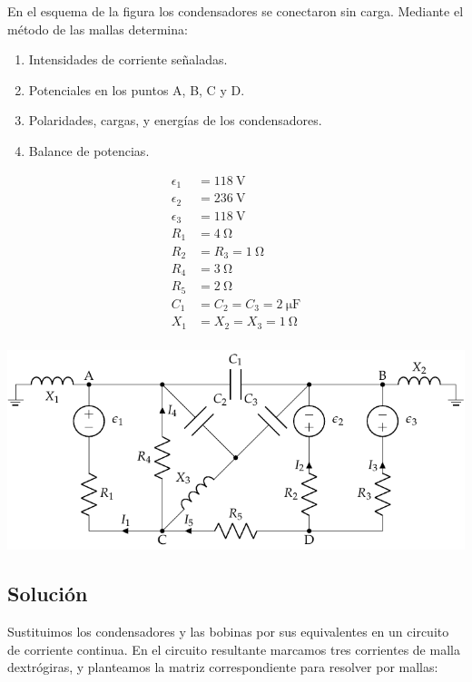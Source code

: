 \documentclass[10pt]{article}
\begin{document}
En el esquema de la figura los condensadores se conectaron sin
carga. Mediante el método de las mallas determina:
\begin{enumerate}
\item Intensidades de corriente señaladas.
\item Potenciales en los puntos A, B, C y D.
\item Polaridades, cargas, y energías de los condensadores.
\item Balance de potencias.
\end{enumerate}

\begin{minipage}[c]{0.3\linewidth}
  \begin{align*}
    \epsilon_{1}&=\SI{118}{\volt}\\
    \epsilon_{2}&=\SI{236}{\volt}\\
    \epsilon_{3}&=\SI{118}{\volt}\\
    R_{1}&= \SI{4}{\ohm}\\
    R_{2}&=R_{3}=\SI{1}{\ohm}\\
    R_{4}&= \SI{3}{\ohm}\\
    R_{5}&= \SI{2}{\ohm}\\
    C_{1}&=C_{2}=C_{3}=\SI{2}{\micro\farad}\\
    X_1 &= X_2 = X_3 = \SI{1}{\ohm}\\
  \end{align*}
\end{minipage}
\begin{minipage}[c]{0.7\linewidth}
  \includegraphics{figs/mallas_condensadores.pdf}
\end{minipage}

\subsection*{Solución}
Sustituimos los condensadores y las bobinas por sus equivalentes en un circuito de corriente continua. En el circuito resultante marcamos tres corrientes de malla dextrógiras, y planteamos la matriz correspondiente para resolver por mallas: 
\end{document}
